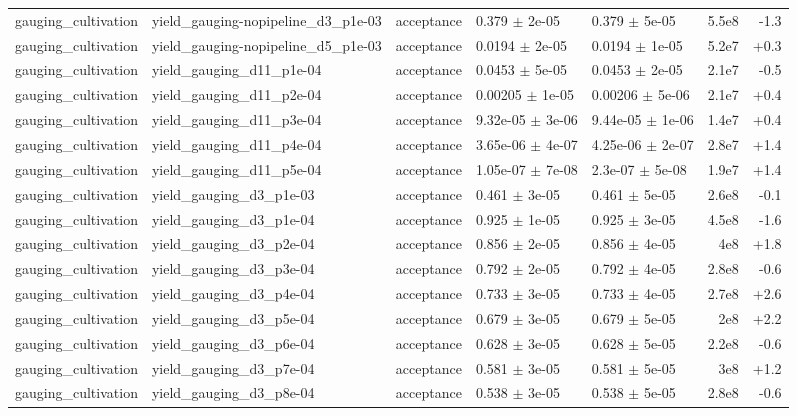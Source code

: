\documentclass[10pt]{article}
\begin{document}
{\begin{longtable}{l l l l l r r}
gauging\_cultivation & yield\_gauging-nopipeline\_d3\_p1e-03 & acceptance & 0.379 $\pm$ 2e-05 & 0.379 $\pm$ 5e-05 & 5.5e8 & -1.3 \\
gauging\_cultivation & yield\_gauging-nopipeline\_d5\_p1e-03 & acceptance & 0.0194 $\pm$ 2e-05 & 0.0194 $\pm$ 1e-05 & 5.2e7 & +0.3 \\
gauging\_cultivation & yield\_gauging\_d11\_p1e-04 & acceptance & 0.0453 $\pm$ 5e-05 & 0.0453 $\pm$ 2e-05 & 2.1e7 & -0.5 \\
gauging\_cultivation & yield\_gauging\_d11\_p2e-04 & acceptance & 0.00205 $\pm$ 1e-05 & 0.00206 $\pm$ 5e-06 & 2.1e7 & +0.4 \\
gauging\_cultivation & yield\_gauging\_d11\_p3e-04 & acceptance & 9.32e-05 $\pm$ 3e-06 & 9.44e-05 $\pm$ 1e-06 & 1.4e7 & +0.4 \\
gauging\_cultivation & yield\_gauging\_d11\_p4e-04 & acceptance & 3.65e-06 $\pm$ 4e-07 & 4.25e-06 $\pm$ 2e-07 & 2.8e7 & +1.4 \\
gauging\_cultivation & yield\_gauging\_d11\_p5e-04 & acceptance & 1.05e-07 $\pm$ 7e-08 & 2.3e-07 $\pm$ 5e-08 & 1.9e7 & +1.4 \\
gauging\_cultivation & yield\_gauging\_d3\_p1e-03 & acceptance & 0.461 $\pm$ 3e-05 & 0.461 $\pm$ 5e-05 & 2.6e8 & -0.1 \\
gauging\_cultivation & yield\_gauging\_d3\_p1e-04 & acceptance & 0.925 $\pm$ 1e-05 & 0.925 $\pm$ 3e-05 & 4.5e8 & -1.6 \\
gauging\_cultivation & yield\_gauging\_d3\_p2e-04 & acceptance & 0.856 $\pm$ 2e-05 & 0.856 $\pm$ 4e-05 & 4e8 & +1.8 \\
gauging\_cultivation & yield\_gauging\_d3\_p3e-04 & acceptance & 0.792 $\pm$ 2e-05 & 0.792 $\pm$ 4e-05 & 2.8e8 & -0.6 \\
gauging\_cultivation & yield\_gauging\_d3\_p4e-04 & acceptance & 0.733 $\pm$ 3e-05 & 0.733 $\pm$ 4e-05 & 2.7e8 & +2.6 \\
gauging\_cultivation & yield\_gauging\_d3\_p5e-04 & acceptance & 0.679 $\pm$ 3e-05 & 0.679 $\pm$ 5e-05 & 2e8 & +2.2 \\
gauging\_cultivation & yield\_gauging\_d3\_p6e-04 & acceptance & 0.628 $\pm$ 3e-05 & 0.628 $\pm$ 5e-05 & 2.2e8 & -0.6 \\
gauging\_cultivation & yield\_gauging\_d3\_p7e-04 & acceptance & 0.581 $\pm$ 3e-05 & 0.581 $\pm$ 5e-05 & 3e8 & +1.2 \\
gauging\_cultivation & yield\_gauging\_d3\_p8e-04 & acceptance & 0.538 $\pm$ 3e-05 & 0.538 $\pm$ 5e-05 & 2.8e8 & -0.6 \\

\end{longtable}}
\end{document}
